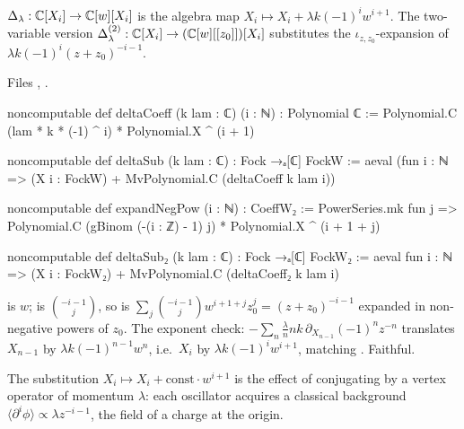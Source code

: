 \begin{definition}\label{l11:def:lidelta}
$\Delta_\lambda:{\mathbb{C}}[X_i]\to{\mathbb{C}}[w][X_i]$ is the algebra map $X_i\mapsto X_i+\lambda k(-1)^iw^{i+1}$. The two-variable version
$\Delta_\lambda^{(2)}:{\mathbb{C}}[X_i]\to({\mathbb{C}}[w][[z_0]])[X_i]$ substitutes the $\iota_{z,z_0}$-expansion of $\lambda k(-1)^i(z+z_0)^{-i-1}$.
\end{definition}
\noindent Files , .
\begin{leancode}
noncomputable def deltaCoeff (k lam : ℂ) (i : ℕ) : Polynomial ℂ :=
  Polynomial.C (lam * k * (-1) ^ i) * Polynomial.X ^ (i + 1)

noncomputable def deltaSub (k lam : ℂ) : Fock →ₐ[ℂ] FockW :=
  aeval (fun i : ℕ => (X i : FockW) + MvPolynomial.C (deltaCoeff k lam i))

noncomputable def expandNegPow (i : ℕ) : CoeffW₂ :=
  PowerSeries.mk fun j =>
    Polynomial.C (gBinom (-(i : ℤ) - 1) j) * Polynomial.X ^ (i + 1 + j)

noncomputable def deltaSub₂ (k lam : ℂ) : Fock →ₐ[ℂ] FockW₂ :=
  aeval fun i : ℕ => (X i : FockW₂) + MvPolynomial.C (deltaCoeff₂ k lam i)
\end{leancode}

\begin{dictionary}
 is $w$;  is $\binom{-i-1}j$, so  is
$\sum_j\binom{-i-1}jw^{i+1+j}z_0^j = (z+z_0)^{-i-1}$ expanded in non-negative powers of $z_0$. The exponent check:
$-\sum_n\frac\lambda nnk\,\partial_{X_{n-1}}(-1)^nz^{-n}$ translates $X_{n-1}$ by $\lambda k(-1)^{n-1}w^n$, i.e.\ $X_i$ by
$\lambda k(-1)^iw^{i+1}$, matching . Faithful.
\end{dictionary}

\begin{physics}
The substitution $X_i\mapsto X_i+\text{const}\cdot w^{i+1}$ is the effect of conjugating by a vertex operator of momentum $\lambda$:
each oscillator acquires a classical background $\langle\partial^i\phi\rangle\propto\lambda z^{-i-1}$, the field of a charge at the origin.
\end{physics}


